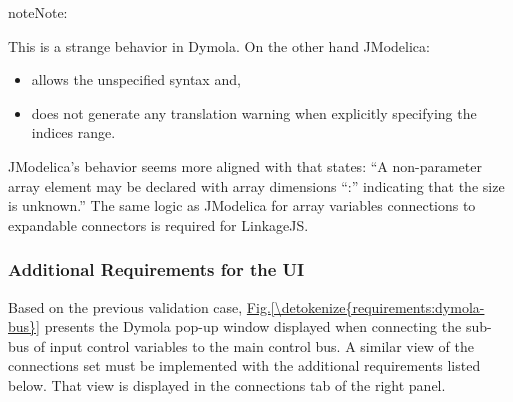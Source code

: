 \documentclass[letterpaper,10pt, openany,english]{sphinxmanual}
\begin{document}
\begin{sphinxadmonition}{note}{Note:}
\begin{sphinxVerbatim}[commandchars=\\\{\}]
 \PYG{p}{[}\PYG{p}{]}

  
\PYG{p}{[}\PYG{p}{]}  
\PYG{p}{[}\PYG{p}{]}  
\PYG{p}{[}\PYG{p}{]} 
\PYG{p}{[}\PYG{p}{]} 
\end{sphinxVerbatim}

This is a strange behavior in Dymola. On the other hand JModelica:
\begin{itemize}
\item {} 
allows the unspecified \sphinxcode{\sphinxupquote{{[}:{]}}} syntax and,

\item {} 
does not generate any translation warning when explicitly specifying the indices range.

\end{itemize}

JModelica’s behavior seems more aligned with   that states: “A non-parameter array element may be declared with array dimensions “:” indicating that the size is unknown.”
The same logic as JModelica for array variables connections to expandable connectors is required for LinkageJS.
\end{sphinxadmonition}


\subsubsection{Additional Requirements for the UI}
\label{\detokenize{requirements:additional-requirements-for-the-ui}}\label{\detokenize{requirements:sec-connect-ui-req}}
Based on the previous validation case, \hyperref[\detokenize{requirements:dymola-bus}]{Fig.\@ \ref{\detokenize{requirements:dymola-bus}}} presents the Dymola pop-up window displayed when connecting the sub-bus of input control variables to the main control bus.
A similar view of the connections set must be implemented with the additional requirements listed below. That view is displayed in the connections tab of the right panel.
\end{document}
